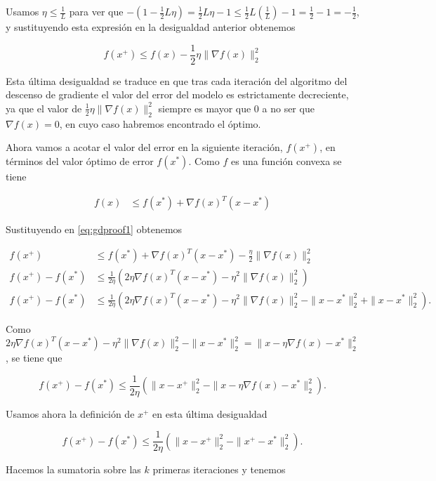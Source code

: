 Usamos $\eta \leq \frac{1}{L}$ para ver que $-(1-\frac{1}{2}L \eta)= \frac{1}{2} L \eta - 1 \leq \frac{1}{2} L (\frac{1}{L}) - 1 = \frac{1}{2} - 1 = -\frac{1}{2}$, y sustituyendo esta expresión en la desigualdad anterior obtenemos 

\begin{equation}\label{eq:gdproof1}
	f(x^+) \leq f(x) - \frac{1}{2} \eta \| \nabla f(x) \|^2_2 
\end{equation}

Esta última desigualdad se traduce en que tras cada iteración del algoritmo del descenso de gradiente el valor del error del modelo es estrictamente decreciente, ya que el valor de $\frac{1}{2} \eta \| \nabla f(x) \|^2_2$ siempre es mayor que 0 a no ser que $\nabla f(x)=0$, en cuyo caso habremos encontrado el óptimo. 

Ahora vamos a acotar el valor del error en la siguiente iteración, $f(x^+)$, en términos del valor óptimo de error $f(x^*)$. Como $f$ es una función convexa se tiene

\begin{align*}
    f(x) &\leq f(x^*) + \nabla f(x)^T (x-x^*)
\end{align*}

Sustituyendo en \ref{eq:gdproof1} obtenemos

\begin{align*}
    f(x^+) &\leq f(x^*) + \nabla f(x)^T (x-x^*) - \frac{\eta}{2} \| \nabla f(x) \| ^2_2 \\ 
    f(x^+) - f(x^*) &\leq  \frac{1}{2\eta}  \left ( 2 \eta \nabla f(x)^T (x-x^*) - \eta ^2 \| \nabla f(x) \| ^2_2 \right ) \\ 
    f(x^+) - f(x^*) &\leq  \frac{1}{2\eta}  \left ( 2 \eta \nabla f(x)^T (x-x^*) - \eta ^2 \| \nabla f(x) \| ^2_2 - \| x - x^* \|^2_2 + \| x - x^* \|^2_2 \right ).    
\end{align*}

Como $  2 \eta \nabla f(x)^T (x-x^*) - \eta ^2 \| \nabla f(x) \| ^2_2 - \| x - x^* \|^2_2 = \| x - \eta \nabla f(x) - x^* \|^2_2 $, se tiene que

$$ f(x^+) - f(x^*) \leq  \frac{1}{2\eta}  \left ( \| x - x^+ \|^2_2 -  \| x - \eta \nabla f(x) - x^* \|^2_2 \right ) .$$

Usamos ahora la definición de $x^+$ en esta última desigualdad

$$ f(x^+) - f(x^*) \leq  \frac{1}{2\eta}  \left ( \| x - x^+ \|^2_2 -  \| x^+ - x^* \|^2_2 \right ) .$$

Hacemos la sumatoria sobre las $k$ primeras iteraciones y tenemos

